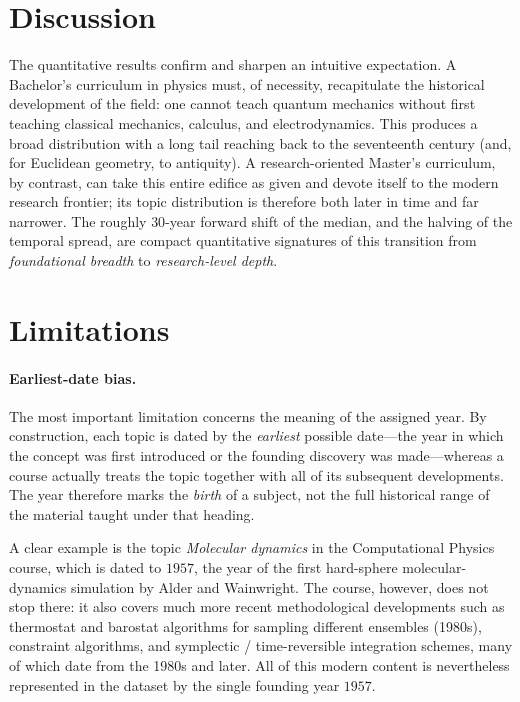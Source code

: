 \documentclass[11pt,a4paper]{article}
\begin{document}
\section{Discussion}
The quantitative results confirm and sharpen an intuitive expectation. A
Bachelor's curriculum in physics must, of necessity, recapitulate the historical
development of the field: one cannot teach quantum mechanics without first
teaching classical mechanics, calculus, and electrodynamics. This produces a
broad distribution with a long tail reaching back to the seventeenth century
(and, for Euclidean geometry, to antiquity). A research-oriented Master's
curriculum, by contrast, can take this entire edifice as given and devote itself
to the modern research frontier; its topic distribution is therefore both later
in time and far narrower. The roughly $30$-year forward shift of the median, and
the halving of the temporal spread, are compact quantitative signatures of this
transition from \emph{foundational breadth} to \emph{research-level depth}.

\section{Limitations}

\paragraph{Earliest-date bias.}
The most important limitation concerns the meaning of the assigned year. By
construction, each topic is dated by the \emph{earliest} possible date---the
year in which the concept was first introduced or the founding discovery was
made---whereas a course actually treats the topic together with all of its
subsequent developments. The year therefore marks the \emph{birth} of a subject,
not the full historical range of the material taught under that heading.

A clear example is the topic \textit{Molecular dynamics} in the Computational
Physics course, which is dated to $1957$, the year of the first hard-sphere
molecular-dynamics simulation by Alder and Wainwright. The course, however, does
not stop there: it also covers much more recent methodological developments such
as thermostat and barostat algorithms for sampling different ensembles
(1980s), constraint algorithms, and symplectic / time-reversible integration
schemes, many of which date from the 1980s and later. All of this modern content
is nevertheless represented in the dataset by the single founding year $1957$.
\end{document}
